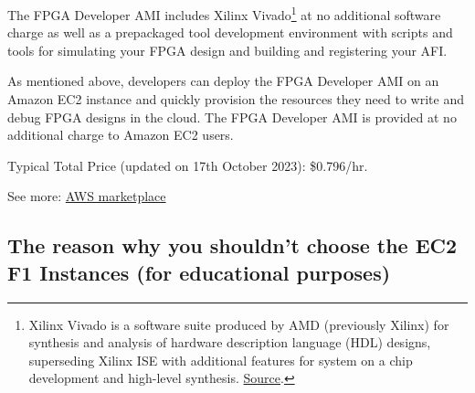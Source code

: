 \documentclass[a4paper]{article}
\begin{document}
    \noindent
    The FPGA Developer AMI includes Xilinx Vivado\footnote{Xilinx Vivado is a software suite produced by AMD (previously Xilinx) for synthesis and analysis of hardware description language (HDL) designs, superseding Xilinx ISE with additional features for system on a chip development and high-level synthesis. \href{https://en.wikipedia.org/wiki/Vivado}{Source}.} at no additional software charge as well as a prepackaged tool development environment with scripts and tools for simulating your FPGA design and building and registering your AFI.\newline

    \noindent
    As mentioned above, developers can deploy the FPGA Developer AMI on an Amazon EC2 instance and quickly provision the resources they need to write and debug FPGA designs in the cloud. The FPGA Developer AMI is provided at no additional charge to Amazon EC2 users.\newline

    \noindent
    Typical Total Price (updated on 17th October 2023): \$0.796/hr.\newline

    \noindent
    See more: \href{https://aws.amazon.com/marketplace/pp/prodview-iehshpgi7hcjg}{AWS marketplace}\newpage

    \subsection{The reason why you shouldn't choose the EC2 F1 Instances (for educational purposes)}
\end{document}
